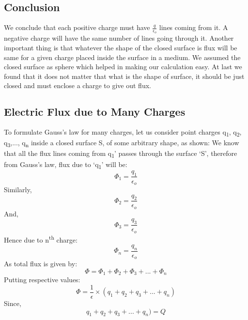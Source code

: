 \subsection*{Conclusion}
We conclude that each positive charge must have $\frac{q}{\epsilon_{o}}$ lines coming from it.
A negative charge will have the same number of lines going through it.
Another important thing is that whatever the shape of the closed surface
is flux will be same for a given charge placed inside the surface in a
medium. We assumed the closed surface as sphere which helped in making
our calculation easy. At last we found that it does not matter that
what is the shape of surface, it should be just closed and must enclose
a charge to give out flux.
\subsection{Electric Flux due to Many Charges}
To formulate Gauss’s law for many charges,
let us consider point charges q\textsubscript{1}, q\textsubscript{2},
q\textsubscript{3},..., q\textsubscript{n}
inside a closed surface S, of some arbitrary shape, as shown:
We know that all the flux lines coming from q\textsubscript{1}’ passes through the surface ‘S’,
therefore from Gauss’s law, flux due to ‘q\textsubscript{1}’ will be:
\begin{equation}
  \Phi_{1} = \frac{q_{1}}{\epsilon_{o}} \nonumber
\end{equation}
Similarly,
\begin{equation}
  \Phi_{2} = \frac{q_{2}}{\epsilon_{o}} \nonumber
\end{equation}
And,
\begin{equation}
  \Phi_{3} = \frac{q_{3}}{\epsilon_{o}} \nonumber
\end{equation}
Hence due to n\textsuperscript{th} charge:
\begin{equation}
  \Phi_{n} = \frac{q_{n}}{\epsilon_{o}} \nonumber
\end{equation}
As total flux is given by:
\begin{equation}
  \Phi =  \Phi_{1}+ \Phi_{2}+ \Phi_{3}+...+ \Phi_{n} \nonumber
\end{equation}
Putting respective values:
\begin{equation}
  \Phi = \frac{1}{\epsilon}\times (q_{1}+q_{2}+q_{3}+...+q_{n}) \nonumber
\end{equation}
Since,
\begin{equation}
  q_{1}+q_{2}+q_{3}+...+q_{n}) = Q \nonumber
\end{equation}
